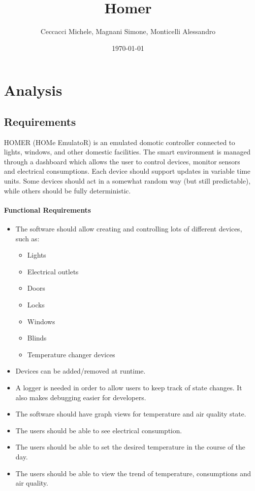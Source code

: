 \documentclass[a4paper,12pt]{report}
\title{Homer}
\author{Ceccacci Michele, Magnani Simone, Monticelli Alessandro}
\date{\today}
\begin{document}
\maketitle

\begin{abstract}
\end{abstract}

\tableofcontents

\chapter{Analysis}
\section{Requirements}

HOMER (HOMe EmulatoR) is an emulated domotic controller connected to lights, windows, and other domestic facilities.
The smart environment is managed through a dashboard which allows the user to control devices, monitor sensors and electrical consumptions.
Each device should support updates in variable time units.
Some devices should act in a somewhat random way (but still predictable), while others should be fully deterministic.

\subsubsection{Functional Requirements}

\begin{itemize}
	\item The software should allow creating and controlling lots of different devices, such as:
	\begin{itemize}
		\item Lights
		\item Electrical outlets
		\item Doors
		\item Locks
		\item Windows
		\item Blinds
		\item Temperature changer devices
	\end{itemize}
	\item Devices can be added/removed at runtime.
	\item A logger is needed in order to allow users to keep track of state changes. It also makes debugging easier for developers.
	\item The software should have graph views for temperature and air quality state.
	\item The users should be able to see electrical consumption.
	\item The users should be able to set the desired temperature in the course of the day.
	\item The users should be able to view the trend of temperature, consumptions and air quality.
\end{itemize}
\end{document}
